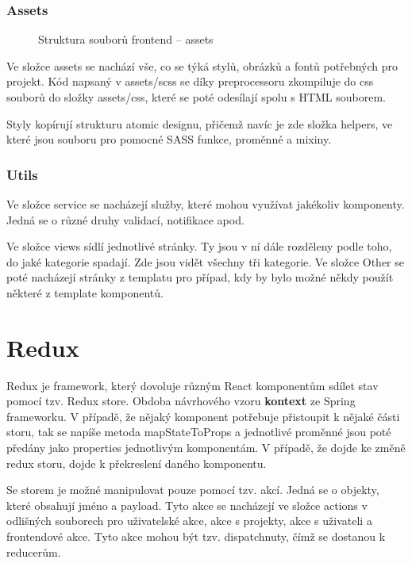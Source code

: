 \documentclass[a4paper,oneside,12pt]{report}
\begin{document}
\subsubsection{Assets}

\begin{figure}[H]
   \caption[Struktura souborů frontendu -- assets]{Struktura souborů frontend -- assets}
   \label{fig:frontendStructureAssets}
\end{figure}
Ve složce assets se nachází vše, co se týká stylů, obrázků a fontů potřebných pro projekt.
Kód napsaný v assets/scss se díky preprocessoru zkompiluje do css souborů do složky assets/css, které se poté odesílají spolu s HTML souborem.

Styly kopírují strukturu atomic designu, přičemž navíc je zde složka helpers, ve které jsou souboru pro pomocné SASS funkce, proměnné a mixiny.

\subsubsection{Utils}
Ve složce service se nacházejí služby, které mohou využívat jakékoliv komponenty.
Jedná se o různé druhy validací, notifikace apod.

Ve složce views sídlí jednotlivé stránky.
Ty jsou v ní dále rozděleny podle toho, do jaké kategorie spadají.
Zde jsou vidět všechny tři kategorie.
Ve složce Other se poté nacházejí stránky z templatu pro případ, kdy by bylo možné někdy použít některé z template komponentů.

\section{Redux}

Redux je framework, který dovoluje různým React komponentům sdílet stav pomocí tzv. Redux store. Obdoba návrhového vzoru \textbf{kontext} ze Spring frameworku.
V případě, že nějaký komponent potřebuje přistoupit k nějaké části storu, tak se napíše metoda mapStateToProps a jednotlivé proměnné jsou poté předány jako properties jednotlivým komponentám.
V případě, že dojde ke změně redux storu, dojde k překreslení daného komponentu.

Se storem je možné manipulovat pouze pomocí tzv. akcí.
Jedná se o objekty, které obsahují jméno a payload.
Tyto akce se nacházejí ve složce actions v odlišných souborech pro uživatelské akce, akce s projekty, akce s uživateli a frontendové akce.
Tyto akce mohou být tzv. dispatchnuty, čímž se dostanou k reducerům.
\end{document}
